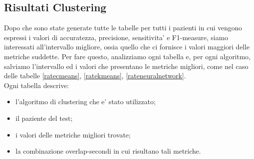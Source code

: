 \subsection{Risultati Clustering}
Dopo che sono state generate tutte le tabelle per tutti i pazienti in cui vengono espressi i valori di accuratezza, precisione, sensitivita' e F1-measure, siamo interessati all'intervallo migliore, ossia quello che ci fornisce i valori maggiori delle metriche suddette. Per fare questo, analizziamo ogni tabella e, per ogni algoritmo, salviamo l'intervallo ed i valori che presentano le metriche migliori, come nel caso delle tabelle \ref{ratecmeans}, \ref{ratekmeans}, \ref{rateneuralnetwork}.\\
Ogni tabella descrive:
\begin{itemize}
	\item l'algoritmo di clustering che e' stato utilizzato;
	\item il paziente del test;
	\item i valori delle metriche migliori trovate;
	\item la combinazione overlap-secondi in cui risultano tali metriche.
\end{itemize}

